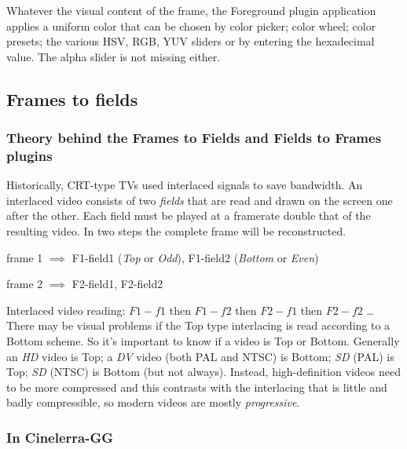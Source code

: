 Whatever the visual content of the frame, the Foreground plugin application applies a uniform color that can be chosen by color picker; color wheel; color presets; the various HSV, RGB, YUV sliders or by entering the hexadecimal value. The alpha slider is not missing either.

\subsection{Frames to fields}%
\label{sub:frames_to_fields}

\subsubsection*{Theory behind the Frames to Fields and Fields to Frames plugins}
\label{ssub:theory_frames_fields}

Historically, CRT-type TVs used interlaced signals to save bandwidth. An interlaced video consists of two \textit{fields} that are read and drawn on the screen one after the other. Each field must be played at a framerate double that of the resulting video. In two steps the complete frame will be reconstructed. 

frame 1 $\implies$ F1-field1 (\textit{Top} or \textit{Odd}), F1-field2 (\textit{Bottom} or \textit{Even})

frame 2 $\implies$ F2-field1, F2-field2

Interlaced video reading: $F1-f1$ then $F1-f2$ then $F2-f1$ then $F2-f2$ \dots
There may be visual problems if the Top type interlacing is read according to a Bottom scheme. So it's important to know if a video is Top or Bottom. Generally an \textit{HD} video is Top; a \textit{DV} video (both PAL and NTSC) is Bottom; \textit{SD} (PAL) is Top; \textit{SD} (NTSC) is Bottom (but not always). Instead, high-definition videos need to be more compressed and this contrasts with the interlacing that is little and badly compressible, so modern videos are mostly \textit{progressive}.

\subsubsection*{In Cinelerra-GG}
\label{ssub:in_cin_gg}

